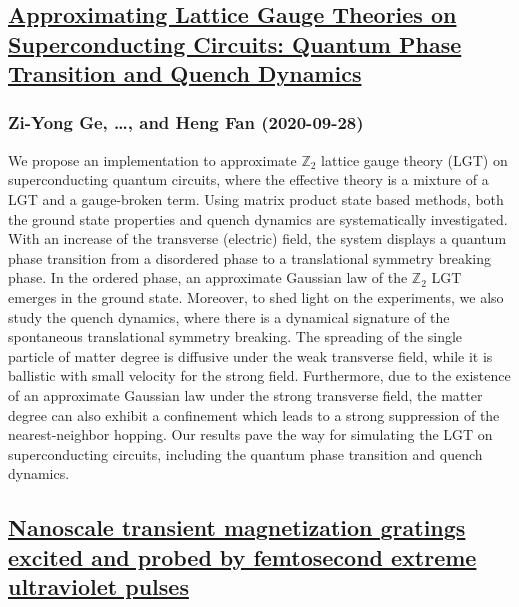 \subsection*{\href{http://arxiv.org/abs/2009.13350v1}{Approximating Lattice Gauge Theories on Superconducting Circuits:  Quantum Phase Transition and Quench Dynamics}}
\subsubsection*{Zi-Yong Ge, \dots, and Heng Fan (2020-09-28)}
We propose an implementation to approximate $\mathbb{Z}_2$ lattice gauge
theory (LGT) on superconducting quantum circuits, where the effective theory is
a mixture of a LGT and a gauge-broken term. Using matrix product state based
methods, both the ground state properties and quench dynamics are
systematically investigated. With an increase of the transverse (electric)
field, the system displays a quantum phase transition from a disordered phase
to a translational symmetry breaking phase. In the ordered phase, an
approximate Gaussian law of the $\mathbb{Z}_2$ LGT emerges in the ground state.
Moreover, to shed light on the experiments, we also study the quench dynamics,
where there is a dynamical signature of the spontaneous translational symmetry
breaking. The spreading of the single particle of matter degree is diffusive
under the weak transverse field, while it is ballistic with small velocity for
the strong field. Furthermore, due to the existence of an approximate Gaussian
law under the strong transverse field, the matter degree can also exhibit a
confinement which leads to a strong suppression of the nearest-neighbor
hopping. Our results pave the way for simulating the LGT on superconducting
circuits, including the quantum phase transition and quench dynamics.

\subsection*{\href{http://arxiv.org/abs/2009.13330v1}{Nanoscale transient magnetization gratings excited and probed by  femtosecond extreme ultraviolet pulses}}
